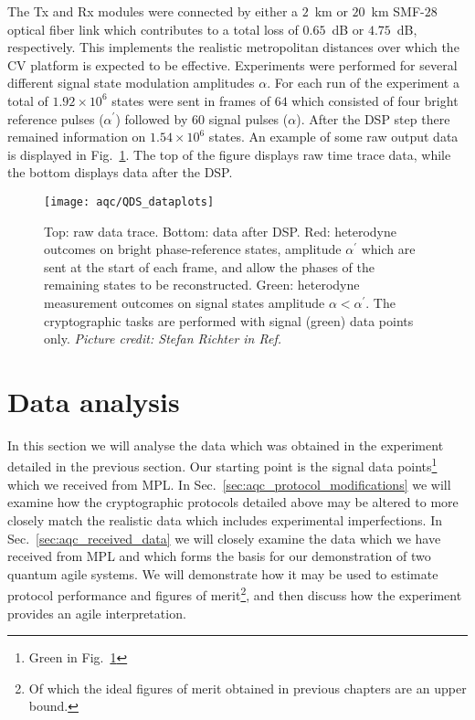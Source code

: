 The Tx and Rx modules were connected by either a $2$~km or $20$~km SMF-$28$ optical fiber link which contributes to a total loss of $0.65$~dB or $4.75$~dB, respectively. This implements the realistic metropolitan distances over which the CV platform is expected to be effective. Experiments were performed for several different signal state modulation amplitudes $\alpha$. For each run of the experiment a total of $1.92\times 10^6$ states were sent in frames of $64$ which consisted of four bright reference pulses ($\alpha^\prime$) followed by $60$ signal pulses ($\alpha$). After the DSP step there remained information on $1.54 \times 10^6$ states. An example of some raw output data is displayed in Fig.~\ref{fig:aqc_experimental_trace}. The top of the figure displays raw time trace data, while the bottom displays data after the DSP.


\begin{figure}[htp]
\captionsetup{width=\linewidth}
\centering
\texttt{[image: aqc/QDS\_dataplots]}
\caption{\label{fig:aqc_experimental_trace} Top: raw data trace. Bottom: data after DSP. Red: heterodyne outcomes on bright phase-reference states, amplitude $\alpha^\prime$ which are sent at the start of each frame, and allow the phases of the remaining states to be reconstructed. Green: heterodyne measurement outcomes on signal states amplitude $\alpha < \alpha^\prime$. The cryptographic tasks are performed with signal (green) data points only. \emph{Picture credit: Stefan Richter in Ref.~\cite{Richter2020}}
}
\end{figure}

\clearpage
\section{Data analysis}
In this section we will analyse the data which was obtained in the experiment detailed in the previous section. Our starting point is the signal data points\footnote{Green in Fig.~\ref{fig:aqc_experimental_trace}} which we received from MPL. In Sec.~\ref{sec:aqc_protocol_modifications} we will examine how the cryptographic protocols detailed above may be altered to more closely match the realistic data which includes experimental imperfections. %
In Sec.~\ref{sec:aqc_received_data} we will closely examine the data which we have received from MPL and which forms the basis for our demonstration of two quantum agile systems. We will demonstrate how it may be used to estimate protocol performance and figures of merit\footnote{Of which the ideal figures of merit obtained in previous chapters are an upper bound.}, and then discuss how the experiment provides an agile interpretation.

